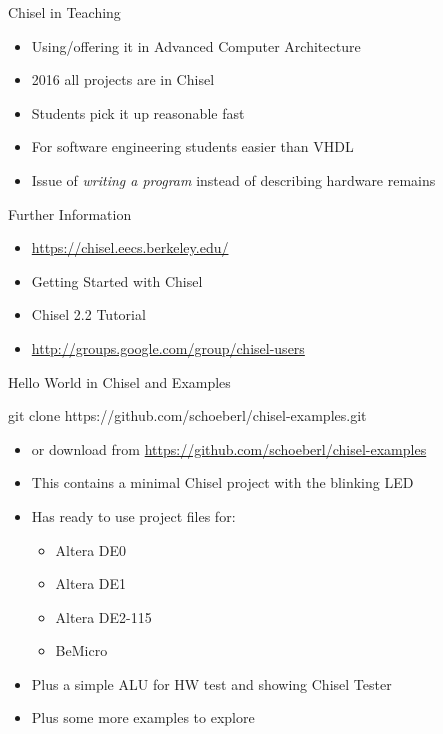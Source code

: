 \documentclass[xcolor=pdflatex,dvipsnames,table]{beamer}
\begin{document}
\begin{frame}[fragile]{Chisel in Teaching}
\begin{itemize}
\item Using/offering it in Advanced Computer Architecture
\item 2016 all projects are in Chisel
\item Students pick it up reasonable fast
\item For software engineering students easier than VHDL
\item Issue of \emph{writing a program} instead of describing hardware remains
\end{itemize}
\end{frame}

\begin{frame}[fragile]{Further Information}
\begin{itemize}
\item \url{https://chisel.eecs.berkeley.edu/}
\item Getting Started with Chisel
\item Chisel 2.2 Tutorial
\item \url{http://groups.google.com/group/chisel-users}
\end{itemize}
\end{frame}


\begin{frame}[fragile]{Hello World in Chisel and Examples}
\begin{chisel}
git clone https://github.com/schoeberl/chisel-examples.git
\end{chisel}
\begin{itemize}
\item or download from \url{https://github.com/schoeberl/chisel-examples}
\item This contains a minimal Chisel project with the blinking LED
\item Has ready to use project files for:
\begin{itemize}
\item Altera DE0
\item Altera DE1
\item Altera DE2-115
\item BeMicro
\end{itemize}
\item Plus a simple ALU for HW test and showing Chisel Tester
\item Plus some more examples to explore
\end{itemize}
\end{frame}
\end{document}
